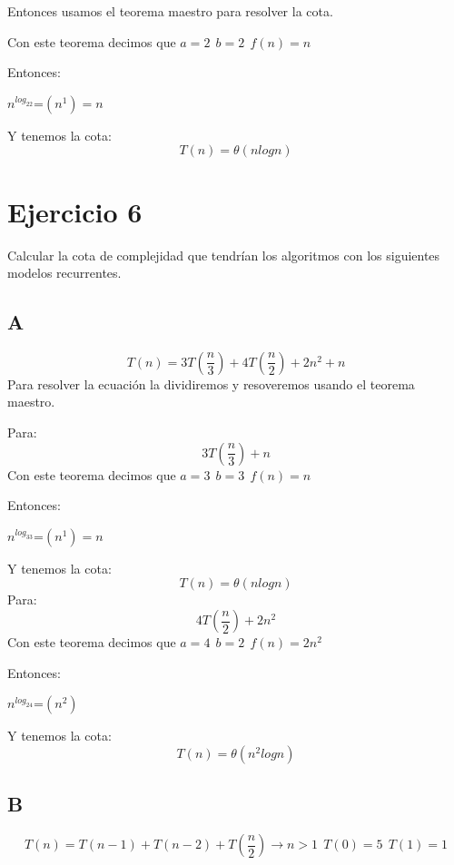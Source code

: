 \documentclass[12pt, fleqn]{article}                             %
\theoremstyle{break}                                            %
\begin{document}
Entonces usamos el teorema maestro para resolver la cota.

Con este teorema decimos que $a=2\:\:b=2\:\:f(n)=n$

Entonces:


$n^{log_22}$=$(n^1)=n$

Y tenemos la cota:
\begin{equation*}
    T(n)=\theta(nlogn)
\end{equation*}


\section{Ejercicio 6}
Calcular la cota de complejidad que tendrían los algoritmos con los siguientes modelos recurrentes.
    \subsection{A}
    \begin{equation*}
        T(n)=3T(\dfrac{n}{3})+4T(\dfrac{n}{2})+2n^2+n
    \end{equation*}
    Para resolver la ecuación la dividiremos y resoveremos usando el teorema maestro.

    Para:
    \begin{equation*}
        3T(\dfrac{n}{3})+n
    \end{equation*}
    Con este teorema decimos que $a=3\:\:b=3\:\:f(n)=n$

    Entonces:


    $n^{log_33}$=$(n^1)=n$

    Y tenemos la cota:
    \begin{equation*}
        T(n)=\theta(nlogn)
    \end{equation*}
    Para:
    \begin{equation*}
        4T(\dfrac{n}{2})+2n^2
    \end{equation*}
    Con este teorema decimos que $a=4\:\:b=2\:\:f(n)=2n^2$

    Entonces:


    $n^{log_24}$=$(n^2)$

    Y tenemos la cota:
    \begin{equation*}
        T(n)=\theta(n^2logn)
    \end{equation*}

    \subsection{B}
    \begin{equation*}
        T(n)=T(n-1)+T(n-2)+T(\dfrac{n}{2}) \rightarrow n>1 \:\: T(0)=5 \:\: T(1)=1
    \end{equation*}
\end{document}
